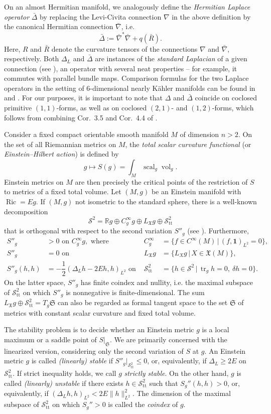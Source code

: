 \documentclass[12pt]{scrartcl}
\theoremstyle{plain}
\theoremstyle{definition}
\newcommand{\R}{\mathbb{R}}%
\newcommand{\Ric}{\operatorname{Ric}}%
\newcommand{\scal}{\operatorname{scal}}%
\newcommand{\vol}{\operatorname{vol}}%
\newcommand{\tr}{\operatorname{tr}}%
\renewcommand{\S}{\mathscr{S}}%
\newcommand{\Sl}{\mathfrak{S}}%
\newcommand{\X}{\mathfrak{X}}%
\newcommand{\Einstein}{E}%
\newcommand{\TT}{\S^2_{\mathrm{tt}}}%
\begin{document}
On an almost Hermitian manifold, we analogously define the \emph{Hermitian Laplace operator} $\bar\Delta$ by replacing the Levi-Civita connection $\nabla$ in the above definition by the canonical Hermitian connection $\bar\nabla$, i.e.
\[\bar\Delta:=\bar\nabla^\ast\bar\nabla+q(\bar R).\]
Here, $R$ and $\bar R$ denote the curvature tensors of the connections $\nabla$ and $\bar\nabla$, respectively. Both $\Delta_L$ and $\bar\Delta$ are instances of the \emph{standard Laplacian} of a given connection (see \cite{standardlapl}), an operator with several neat properties -- for example, it commutes with parallel bundle maps. Comparison formulas for the two Laplace operators in the setting of $6$-dimensional nearly Kähler manifolds can be found in \cite{hermitianlaplace} and \cite{nearlykaehler}. For our purposes, it is important to note that $\Delta$ and $\bar\Delta$ coincide on coclosed primitive $(1,1)$-forms, as well as on coclosed $(2,1)$- and $(1,2)$-forms, which follows from combining Cor.~3.5 and Cor.~4.4 of \cite{nearlykaehler}.

Consider a fixed compact orientable smooth manifold $M$ of dimension $n>2$. On the set of all Riemannian metrics on $M$, the \emph{total scalar curvature functional} (or \emph{Einstein--Hilbert action}) is defined by
\[g\mapsto S(g)=\int_M\scal_g\vol_g.\]
Einstein metrics on $M$ are then precisely the critical points of the restriction of $S$ to metrics of a fixed total volume. Let $(M,g)$ be an Einstein manifold with $\Ric=\Einstein g$. If $(M,g)$ not isometric to the standard sphere, there is a well-known decomposition
\[\S^2=\R g\oplus C^\infty_gg\oplus L_\X g\oplus\TT\]
that is orthogonal with respect to the second variation $S''_g$ (see \cite{besse}). Furthermore,
\begin{align*}
S''_g&>0\text{ on }C^\infty_gg,\text{ where }&C^\infty_g&=\{f\in C^\infty(M)\,|\,(f,\mathbf{1})_{L^2}=0\},\\
S''_g&=0\text{ on }&L_\X g&=\{L_Xg\,|\,X\in\X(M)\},\\
S''_g(h,h)&=-\dfrac{1}{2}\left(\Delta_L h-2\Einstein h,h\right)_{L^2}\text{ on }&\TT&=\{h\in\S^2\,|\,\tr_gh=0,\ \delta h=0\}.
\end{align*}
On the latter space, $S''_g$ has finite coindex and nullity, i.e. the maximal subspace of $\TT$ on which $S''_g$ is nonnegative is finite-dimensional. The sum $L_\X g\oplus\TT=T_g\Sl$ can also be regarded as formal tangent space to the set $\Sl$ of metrics with constant scalar curvature and fixed total volume.

The stability problem is to decide whether an Einstein metric $g$ is a local maximum or a saddle point of $S\big|_{\Sl}$. We are primarily concerned with the linearized version, considering only the second variation of $S$ at $g$. An Einstein metric $g$ is called \emph{(linearly) stable} if $S''_g\big|_{\TT}\leq0$, or, equivalently, if $\Delta_L\geq 2\Einstein$ on $\TT$. If strict inequality holds, we call $g$ \emph{strictly stable}. On the other hand, $g$ is called \emph{(linearly) unstable} if there exists $h\in\TT$ such that $S_g''(h,h)>0$, or, equivalently, if $(\Delta_Lh,h)_{L^2}<2\Einstein\|h\|^2_{L^2}$. The dimension of the maximal subspace of $\TT$ on which $S_g''>0$ is called the \emph{coindex} of $g$.
\end{document}
